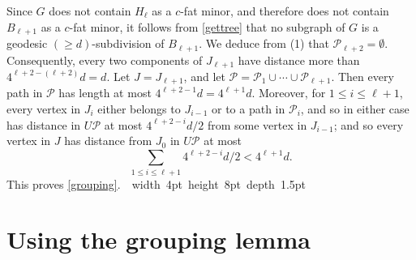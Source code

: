 \documentclass[titlepage,11pt]{article}
\newcommand\blackslug{\hbox{\hskip 1pt \vrule width 4pt height 8pt depth 1.5pt
		\hskip 1pt}}
\newcommand\bbox{\hfill \quad \blackslug \bigbreak}
\newcommand{\cupcup}{\cup \cdots\cup}
\newcommand{\mac}{\mathcal}
\begin{document}
	Since $G$ does not contain $H_{\ell}$ as a $c$-fat minor, and therefore does not contain $B_{\ell+1}$ as a $c$-fat minor, it follows from
	\ref{gettree} that no subgraph of $G$ is a geodesic $(\ge d)$-subdivision of $B_{\ell+1}$. We deduce
	from (1) that $\mac P_{\ell+2}=\emptyset$. Consequently, every two components of $J_{\ell+1}$ have distance more than
	$4^{\ell+2-(\ell+2)}d=d$. Let $J=J_{\ell+1}$, and let $\mac P = \mac P_1\cupcup \mac P_{\ell+1}$. Then every path in $\mac P$ has
	length at most $4^{\ell+2-1}d=4^{\ell+1}d$. Moreover, for $1\le i\le \ell+1$, every vertex in $J_i$ either belongs to $J_{i-1}$ or to a path
	in $\mac P_i$, and so in either case has distance in $U\mac P$ at most $4^{\ell+2-i}d/2$ from some vertex in $J_{i-1}$; and so every 
	vertex in $J$ has distance from $J_0$ in $U\mac P$ 
	at most
	$$\sum_{1\le i\le \ell+1} 4^{\ell+2-i}d/2< 4^{\ell+1} d.$$
	This proves \ref{grouping}.~\bbox
	\section{Using the grouping lemma}
	
\end{document}
